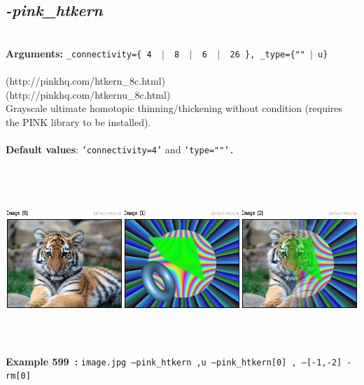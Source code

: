 \documentclass[a4paper,11pt,twoside]{book}
\begin{document}
\subsection{\emph{-pink\_htkern} }\vspace*{-0.5em}
~\\\textbf{Arguments: } 
{\small \texttt{\_connectivity=\{ 4 ~$|$~ 8 ~$|$~ 6 ~$|$~ 26 \}, \_type=\{""~$|$~u\}}}\\~\\
(http://pinkhq.com/htkern\_8c.html)
~\\(http://pinkhq.com/htkernu\_8c.html)
~\\Grayscale ultimate homotopic thinning/thickening without condition (requires the PINK library to be installed).
~\\~\\\textbf{Default values}: {\small \texttt{'connectivity=4'} and \texttt{'type=""'.}}
\begin{center}\includegraphics[keepaspectratio=true,height=7cm,width=\textwidth]{img/gmic_def599.jpg}\\
{\footnotesize \textbf{Example 599~:} \texttt{image.jpg --pink\_htkern ,u --pink\_htkern[0] , ---[-1,-2] -rm[0]}}
\end{center}
\end{document}

